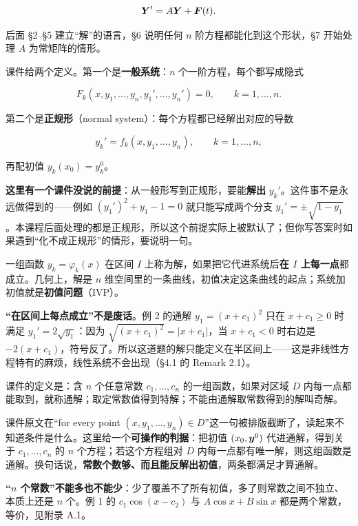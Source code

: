 \documentclass[11pt]{ctexart}
\begin{document}
\[
\boldsymbol{Y}'=A\boldsymbol{Y}+\boldsymbol{F}(t).
\]

后面 §2--§5 建立“解”的语言，§6 说明任何 $n$ 阶方程都能化到这个形状，§7 开始处理 $A$ 为常矩阵的情形。



课件给两个定义。第一个是\textbf{一般系统}：$n$ 个一阶方程，每个都写成隐式

\[
F_k(x,y_1,\dots,y_n,y_1',\dots,y_n')=0,\qquad k=1,\dots,n .
\]

第二个是\textbf{正规形}（normal system）：每个方程都已经解出对应的导数

\[
y_k'=f_k(x,y_1,\dots,y_n),\qquad k=1,\dots,n ,
\]

再配初值 $y_k(x_0)=y_k^0$。

\textbf{这里有一个课件没说的前提}：从一般形写到正规形，要能\textbf{解出} $y_k'$。这件事不是永远做得到的——例如 $(y_1')^2+y_1-1=0$ 就只能写成两个分支 $y_1'=\pm\sqrt{1-y_1}$。本课程后面处理的都是正规形，所以这个前提实际上被默认了；但你写答案时如果遇到“化不成正规形”的情形，要说明一句。


一组函数 $y_k=\varphi_k(x)$ 在区间 $I$ 上称为解，如果把它代进系统后\textbf{在 $I$ 上每一点}都成立。几何上，解是 $n$ 维空间里的一条曲线，初值决定这条曲线的起点；系统加初值就是\textbf{初值问题}（IVP）。

\textbf{“在区间上每点成立”不是废话}。例 2 的通解 $y_1=(x+c_1)^2$ 只在 $x+c_1\ge0$ 时满足 $y_1'=2\sqrt{y_1}$：因为 $\sqrt{(x+c_1)^2}=|x+c_1|$，当 $x+c_1<0$ 时右边是 $-2(x+c_1)$，符号反了。所以这道题的解只能定义在半区间上——这是非线性方程特有的麻烦，线性系统不会出现（§4.1 的 Remark 2.1）。


课件的定义是：含 $n$ 个任意常数 $c_1,\dots,c_n$ 的一组函数，如果对区域 $D$ 内每一点都能取到，就称通解；取定常数值得到特解；不能由通解取常数得到的解叫奇解。

课件原文在“for every point $(x,y_1,\dots,y_n)\in D$”这一句被排版截断了，读起来不知道条件是什么。这里给一个\textbf{可操作的判据}：把初值 $(x_0,\boldsymbol{y}^0)$ 代进通解，得到关于 $c_1,\dots,c_n$ 的 $n$ 个方程；若这个方程组对 $D$ 内每一点都有唯一解，则这组函数是通解。换句话说，\textbf{常数个数够、而且能反解出初值}，两条都满足才算通解。

\textbf{“$n$ 个常数”不能多也不能少}：少了覆盖不了所有初值，多了则常数之间不独立、本质上还是 $n$ 个。例 1 的 $c_1\cos(x-c_2)$ 与 $A\cos x+B\sin x$ 都是两个常数，等价，见附录 A.1。
\end{document}
